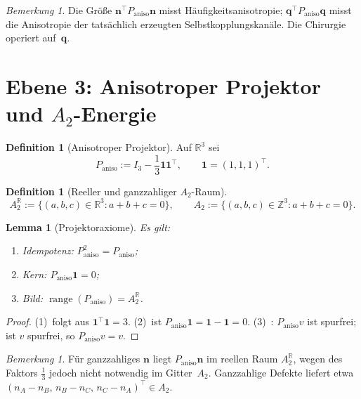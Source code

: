 \documentclass[11pt,a4paper]{article}
\newtheorem{lemma}[theorem]{Lemma}
\theoremstyle{definition}
\newtheorem{definition}[theorem]{Definition}
\theoremstyle{remark}
\newtheorem{remark}[theorem]{Bemerkung}
\newcommand{\R}{\mathbb{R}}
\newcommand{\Z}{\mathbb{Z}}
\newcommand{\one}{\mathbf{1}}
\newcommand{\qq}{\mathbf{q}}
\newcommand{\nn}{\mathbf{n}}
\newcommand{\Pan}{P_{\mathrm{aniso}}}
\begin{document}
	\begin{remark}
		\label{rem:n-vs-q}
		Die Größe $\nn^\top\Pan\nn$ misst Häufigkeitsanisotropie;
		$\qq^\top\Pan\qq$ misst die Anisotropie der tatsächlich erzeugten
		Selbstkopplungskanäle. Die Chirurgie operiert auf~$\qq$.
	\end{remark}
	
	\section{Ebene 3: Anisotroper Projektor und $A_2$-Energie}
	\label{sec:paniso}
	
	\begin{definition}[Anisotroper Projektor]
		\label{def:paniso}
		Auf $\R^3$ sei
		\[
		\Pan
		:=
		I_3-\frac13\one\one^\top,
		\qquad
		\one=(1,1,1)^\top.
		\]
	\end{definition}
	
	\begin{definition}[Reeller und ganzzahliger $A_2$-Raum]
		\label{def:a2}
		\[
		A_2^\R
		:=
		\{(a,b,c)\in\R^3:a+b+c=0\},
		\qquad
		A_2
		:=
		\{(a,b,c)\in\Z^3:a+b+c=0\}.
		\]
	\end{definition}
	
	\begin{lemma}[Projektoraxiome]
		\label{lem:projector}
		Es gilt:
		\begin{enumerate}
			\item Idempotenz: $\Pan^2=\Pan$;
			\item Kern: $\Pan\one=0$;
			\item Bild: $\operatorname{range}(\Pan)=A_2^\R$.
		\end{enumerate}
	\end{lemma}
	
	\begin{proof}
		(1)~folgt aus $\one^\top\one=3$.
		(2)~ist $\Pan\one=\one-\one=0$.
		(3)~: $\Pan v$ ist spurfrei; ist $v$ spurfrei, so $\Pan v=v$.
	\end{proof}
	
	\begin{remark}
		\label{rem:lattice}
		Für ganzzahliges $\nn$ liegt $\Pan\nn$ im reellen Raum $A_2^\R$, wegen des
		Faktors $\tfrac13$ jedoch nicht notwendig im Gitter~$A_2$.
		Ganzzahlige Defekte liefert etwa
		$(n_A-n_B,\,n_B-n_C,\,n_C-n_A)^\top\in A_2$.
	\end{remark}
	
\end{document}
